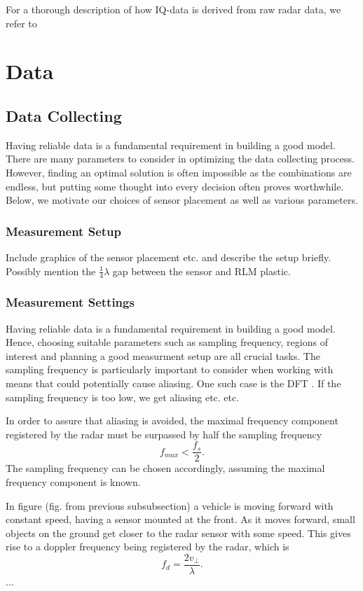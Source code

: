 \documentclass[a4paper, 12pt]{article}
\begin{document}
For a thorough description of how IQ-data is derived from raw radar data, we refer to \citep{richards_2014}

\section{Data}
\subsection{Data Collecting}
Having reliable data is a fundamental requirement in building a good model. There are many parameters to consider in optimizing the data collecting process. However,  finding an optimal solution is often impossible as the combinations are endless, but putting some thought into every decision often proves worthwhile. Below, we motivate our choices of sensor placement as well as various parameters.

\subsubsection{Measurement Setup}


Include graphics of the sensor placement etc. and describe the setup briefly. Possibly mention the $\frac14\lambda$ gap between the sensor and RLM plastic.
\subsubsection{Measurement Settings}
Having reliable data is a fundamental requirement in building a good model. Hence, choosing suitable parameters such as sampling frequency, regions of interest and planning a good measurment setup are all crucial tasks. The sampling frequency is particularly important to consider when working with means that could potentially cause aliasing. One such case is the DFT \citep{lindgren_rootzeŽn_sandsten_2013}. If the sampling frequency is too low, we get aliasing etc. etc. 

In order to assure that aliasing is avoided, the maximal frequency component registered by the radar must be surpassed by half the sampling frequency
\begin{equation}
	f_{max} < \frac{f_s}{2}.
\end{equation}
The sampling frequency can be chosen accordingly, assuming the maximal frequency component is known. 

In figure (fig. from previous subsubsection) a vehicle is moving forward with constant speed, having a sensor mounted at the front. As it moves forward, small objects on the ground get closer to the radar sensor with some speed. This gives rise to a doppler frequency being registered by the radar, which is \citep{lien_gillian_karagozler_amihood_schwesig_olson_raja_poupyrev_2016}
\begin{equation}
	f_{d} = \frac{2v_\perp}{\lambda}.
\end{equation}
...
\end{document}
